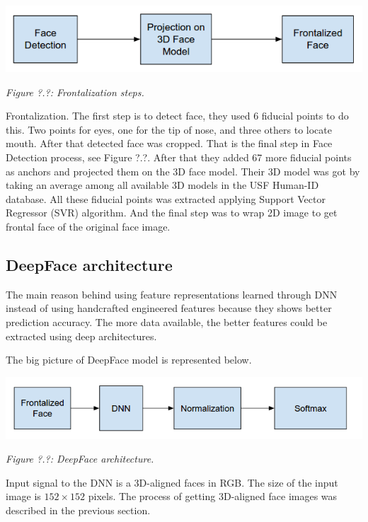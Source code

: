 \documentclass[paper=a4, fontsize=11pt]{scrartcl} %
\numberwithin{equation}{section} %
\numberwithin{figure}{section} %
\numberwithin{table}{section} %
\begin{document}
\begin{center}
\includegraphics[scale=0.5]{pictures/front.png}
\par\large\textit{Figure ?.?: Frontalization steps.}
\end{center}

Frontalization. The first step is to detect face, they used 6 fiducial points to do this. Two points for eyes, one for the tip of nose, and three others to locate mouth. After that detected face was cropped. That is the final step in Face Detection process, see Figure ?.?. After that they added 67 more fiducial points as anchors and projected them on the 3D face model. Their 3D model was got by taking an average among all available 3D models in the USF Human-ID database. All these fiducial points was extracted applying Support Vector Regressor (SVR) algorithm. And the final step was to wrap 2D image to get frontal face of the original face image. 

\subsection{DeepFace architecture}

The main reason behind using feature representations learned through DNN instead of using handcrafted engineered features because they shows better prediction accuracy.  The more data available, the better features could be extracted using deep architectures. \par
The big picture of DeepFace model is represented below. \par

\begin{center}
\includegraphics[scale=0.5]{pictures/deepface.png}
\par\large\textit{Figure ?.?: DeepFace architecture.}
\end{center}

Input signal to the DNN is a 3D-aligned faces in RGB. The size of the input image is $152 \times 152$ pixels. The process of getting 3D-aligned face images was described in the previous section.\par
\end{document}
